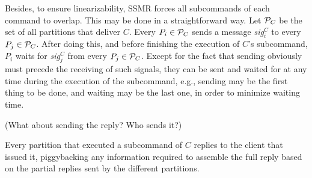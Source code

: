 \documentclass{usiinftr}
\begin{document}
Besides, to ensure linearizability, SSMR forces all subcommands of each command to overlap. This may be done in a straightforward way. Let $\mathcal{P}_C$ be the set of all partitions that deliver $C$. Every $P_i \in \mathcal{P}_C$ sends a message \textit{sig}$^C_i$ to every $P_j \in \mathcal{P}_C$. After doing this, and before finishing the execution of $C$'s subcommand, $P_i$ waits for \textit{sig}$^C_j$ from every $P_j \in \mathcal{P}_C$. Except for the fact that sending obviously must precede the receiving of such signals, they can be sent and waited for at any time during the execution of the subcommand, e.g., sending may be the first thing to be done, and waiting may be the last one, in order to minimize waiting time.

(What about sending the reply? Who sends it?)

Every partition that executed a subcommand of $C$ replies to the client that issued it, piggybacking any information required to assemble the full reply based on the partial replies sent by the different partitions.






\end{document}
